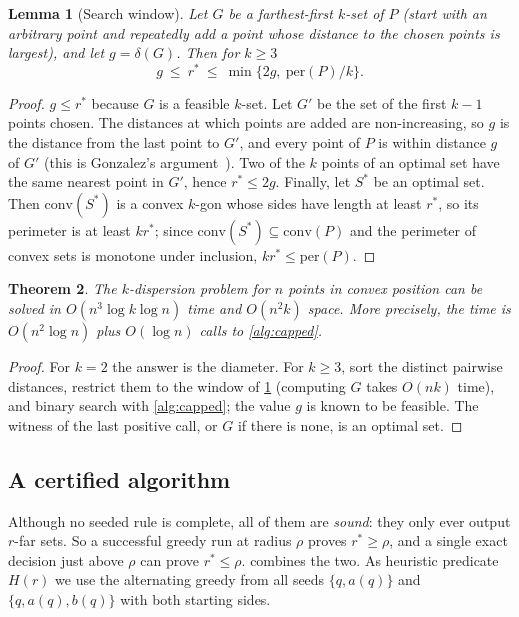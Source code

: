 \documentclass[11pt,a4paper]{article}
\newtheorem{theorem}{Theorem}
\newtheorem{lemma}[theorem]{Lemma}
\theoremstyle{definition}
\theoremstyle{remark}
\newcommand{\per}{\mathrm{per}}
\newcommand{\conv}{\mathrm{conv}}
\newcommand{\rstar}{r^{*}}
\begin{document}
\begin{lemma}[Search window]\label{lem:window}
Let $G$ be a farthest-first $k$-set of $P$ (start with an arbitrary point and
repeatedly add a point whose distance to the chosen points is largest), and
let $g=\delta(G)$. Then for $k\ge3$
\[
g\ \le\ \rstar\ \le\ \min\bigl\{2g,\ \per(P)/k\bigr\}.
\]
\end{lemma}
\begin{proof}
$g\le\rstar$ because $G$ is a feasible $k$-set. Let $G'$ be the set of the
first $k-1$ points chosen. The distances at which points are added are
non-increasing, so $g$ is the distance from the last point to $G'$, and every
point of $P$ is within distance $g$ of $G'$ (this is Gonzalez's
argument~\cite{gonzalez}). Two of the $k$ points of an optimal set have the
same nearest point in $G'$, hence $\rstar\le2g$. Finally, let $S^*$ be an
optimal set. Then $\conv(S^*)$ is a convex $k$-gon whose sides have length at
least $\rstar$, so its perimeter is at least $k\rstar$; since
$\conv(S^*)\subseteq\conv(P)$ and the perimeter of convex sets is monotone
under inclusion, $k\rstar\le\per(P)$.
\end{proof}

\begin{theorem}\label{thm:opt}
The $k$-dispersion problem for $n$ points in convex position can be solved in
$O(n^3\log k\log n)$ time and $O(n^2k)$ space. More precisely, the time is
$O(n^2\log n)$ plus $O(\log n)$ calls to \cref{alg:capped}.
\end{theorem}
\begin{proof}
For $k=2$ the answer is the diameter. For $k\ge3$, sort the distinct pairwise
distances, restrict them to the window of \cref{lem:window} (computing $G$
takes $O(nk)$ time), and binary search with \cref{alg:capped}; the value $g$
is known to be feasible. The witness of the last positive call, or $G$ if there
is none, is an optimal set.
\end{proof}

\subsection{A certified algorithm}\label{sec:certified}

Although no seeded rule is complete, all of them are \emph{sound}: they only
ever output $r$-far sets. So a successful greedy run at radius $\rho$ proves
$\rstar\ge\rho$, and a single exact decision just above $\rho$ can prove
$\rstar\le\rho$.  combines the two. As heuristic predicate
$H(r)$ we use the alternating greedy from all seeds $\{q,a(q)\}$ and
$\{q,a(q),b(q)\}$ with both starting sides.
\end{document}
